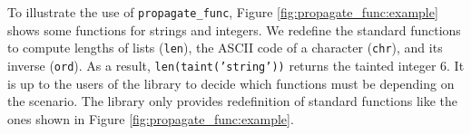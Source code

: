 To illustrate the use of \texttt{propagate\_func}, Figure
\ref{fig:propagate_func:example} shows 
some \nametklass functions 
for strings and integers. We redefine the standard functions to 
compute lengths of lists (\texttt{len}), the ASCII code of a character
(\texttt{chr}), and its inverse (\texttt{ord}). As a result, 
\texttt{len(taint('string'))} returns the tainted integer 6.
It is up to the users 
of the library to decide which functions must be \nametklass depending
on the scenario.
The library only provides 
redefinition of standard functions 
like the ones 
shown in Figure \ref{fig:propagate_func:example}.

